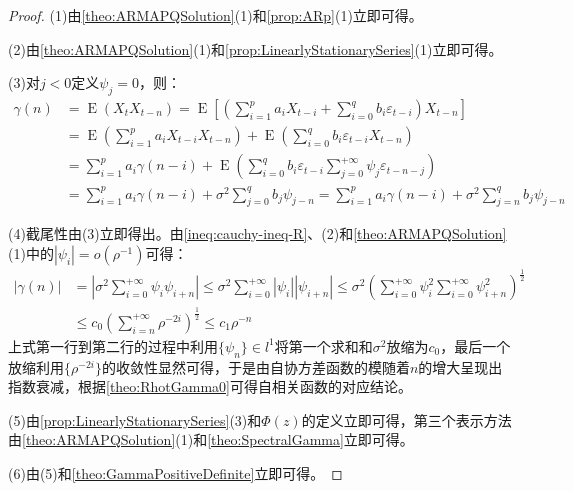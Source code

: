 \begin{proof}
	(1)由\cref{theo:ARMAPQSolution}(1)和\cref{prop:ARp}(1)立即可得。\par
	(2)由\cref{theo:ARMAPQSolution}(1)和\cref{prop:LinearlyStationarySeries}(1)立即可得。\par
	(3)对$j<0$定义$\psi_j=0$，则：
	\begin{align*}
		\gamma(n)&=\operatorname{E}(X_tX_{t-n})=\operatorname{E}\left[\left(\sum_{i=1}^{p}a_iX_{t-i}+\sum_{i=0}^{q}b_i\varepsilon_{t-i}\right)X_{t-n}\right] \\
		&=\operatorname{E}\left(\sum_{i=1}^{p}a_iX_{t-i}X_{t-n}\right)+\operatorname{E}\left(\sum_{i=0}^{q}b_i\varepsilon_{t-i}X_{t-n}\right) \\
		& =\sum_{i=1}^{p}a_i\gamma(n-i)+\operatorname{E}\left(\sum_{i=0}^{q}b_i\varepsilon_{t-i}\sum_{j=0}^{+\infty}\psi_j\varepsilon_{t-n-j}\right) \\
		&=\sum_{i=1}^{p}a_i\gamma(n-i)+\sigma^2\sum_{j=0}^{q}b_j\psi_{j-n}=\sum_{i=1}^{p}a_i\gamma(n-i)+\sigma^2\sum_{j=n}^{q}b_j\psi_{j-n}
	\end{align*}\par
	(4)截尾性由(3)立即得出。由\cref{ineq:cauchy-ineq-R}、(2)和\cref{theo:ARMAPQSolution}(1)中的$|\psi_i|=o(\rho^{-1})$可得：
	\begin{align*}
		|\gamma(n)|&=\left|\sigma^2\sum_{i=0}^{+\infty}\psi_i\psi_{i+n}\right|\leqslant\sigma^2\sum_{i=0}^{+\infty}|\psi_i||\psi_{i+n}|\leqslant\sigma^2\left(\sum_{i=0}^{+\infty}\psi_i^2\sum_{i=0}^{+\infty}\psi_{i+n}^2\right)^{\frac{1}{2}} \\
		&\leqslant c_0\left(\sum_{i=n}^{+\infty}\rho^{-2i}\right)^{\frac{1}{2}}\leqslant c_1\rho^{-n}
	\end{align*}
	上式第一行到第二行的过程中利用$\{\psi_n\}\in l^1$将第一个求和和$\sigma^2$放缩为$c_0$，最后一个放缩利用$\{\rho^{-2i}\}$的收敛性显然可得，于是由自协方差函数的模随着$n$的增大呈现出指数衰减，根据\cref{theo:RhotGamma0}可得自相关函数的对应结论。\par
	(5)由\cref{prop:LinearlyStationarySeries}(3)和$\Phi(z)$的定义立即可得，第三个表示方法由\cref{theo:ARMAPQSolution}(1)和\cref{theo:SpectralGamma}立即可得。\par
	(6)由(5)和\cref{theo:GammaPositiveDefinite}立即可得。
\end{proof}


